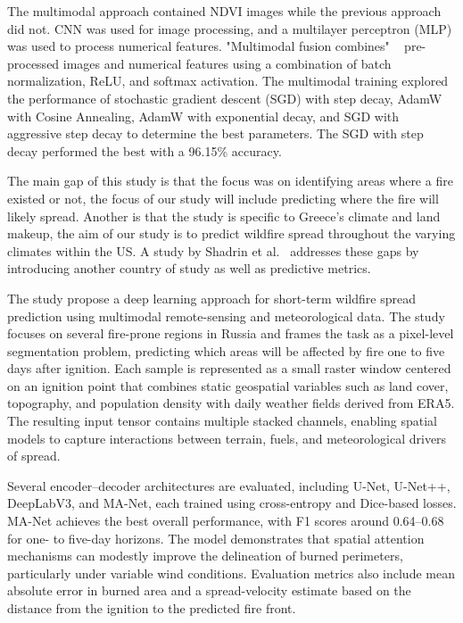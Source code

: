 \documentclass[conference]{IEEEtran}
\begin{document}
The multimodal approach contained NDVI images while the previous approach did not. CNN was used for image processing, and a multilayer perceptron (MLP) was used to process numerical features. "Multimodal fusion combines" \ \cite{papakis2025AMultimodalEnsembleDeepLearning} pre-processed images and numerical features using a combination of batch normalization, ReLU, and softmax activation. The multimodal training explored the performance of stochastic gradient descent (SGD) with step decay, AdamW with Cosine Annealing, AdamW with exponential decay, and SGD with aggressive step decay to determine the best parameters. The SGD with step decay performed the best with a 96.15\% accuracy. 

The main gap of this study is that the focus was on identifying areas where a fire existed or not, the focus of our study will include predicting where the fire will likely spread. Another is that the study is specific to Greece's climate and land makeup, the aim of our study is to predict wildfire spread throughout the varying climates within the US. A study by Shadrin et al.\ \cite{shadrin2024scientificreports} addresses these gaps by introducing another country of study as well as predictive metrics.

The study propose a deep learning approach for short-term wildfire spread prediction using multimodal remote-sensing and meteorological data. The study focuses on several fire-prone regions in Russia and frames the task as a pixel-level segmentation problem, predicting which areas will be affected by fire one to five days after ignition. Each sample is represented as a small raster window centered on an ignition point that combines static geospatial variables such as land cover, topography, and population density with daily weather fields derived from ERA5. The resulting input tensor contains multiple stacked channels, enabling spatial models to capture interactions between terrain, fuels, and meteorological drivers of spread.

Several encoder–decoder architectures are evaluated, including U-Net, U-Net++, DeepLabV3, and MA-Net, each trained using cross-entropy and Dice-based losses. MA-Net achieves the best overall performance, with F1 scores around 0.64–0.68 for one- to five-day horizons. The model demonstrates that spatial attention mechanisms can modestly improve the delineation of burned perimeters, particularly under variable wind conditions. Evaluation metrics also include mean absolute error in burned area and a spread-velocity estimate based on the distance from the ignition to the predicted fire front.
\end{document}
